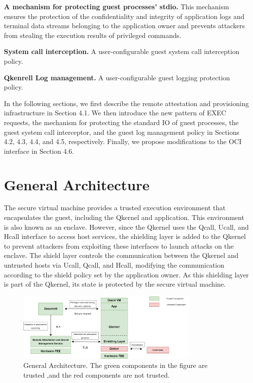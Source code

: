 \textbf{A mechanism for protecting guest processes' stdio.} This mechanism ensures the protection of the confidentiality and integrity of application logs and terminal data streams belonging to the application owner and prevents attackers from stealing 
the execution results of privileged commands.

\textbf{System call interception.} A user-configurable guest system call interception policy.

\textbf{Qkenrell Log management.} A user-configurable guest logging protection policy.

In the following sections, we first describe the remote attestation and provisioning infrastructure in Section 4.1. We then introduce the new pattern of EXEC requests, the mechanism for protecting the standard IO of guest processes, the guest 
system call interceptor, and the guest log management policy in Sections 4.2, 4.3, 4.4, and 4.5, respectively. Finally, we propose modifications to the OCI interface in Section 4.6.


\section{General Architecture}
The secure virtual machine provides a trusted execution environment that encapsulates the guest, including the Qkernel and application. This environment is also known as an enclave. However, since the Qkernel uses the Qcall, Ucall, and Hcall 
interface to access host services, the shielding layer is added to the Qkernel to prevent attackers from exploiting these interfaces to launch attacks on the enclave. The shield layer controls the communication between the Qkernel and untrusted 
hosts via Ucall, Qcall, and Hcall, modifying the communication according to the shield policy set by the application owner. As this shielding layer is part of the Qkernel, its state is protected by the secure virtual machine.

\begin{figure}[H]
    \centering
    \includegraphics[width=0.8\textwidth]{images/genaral_architechture.png}
    \caption[General Architecture]{General Architecture. The green components in the figure are trusted ,and the red components are not trusted.}
    \label{fig:genaral_architechture}
\end{figure}


